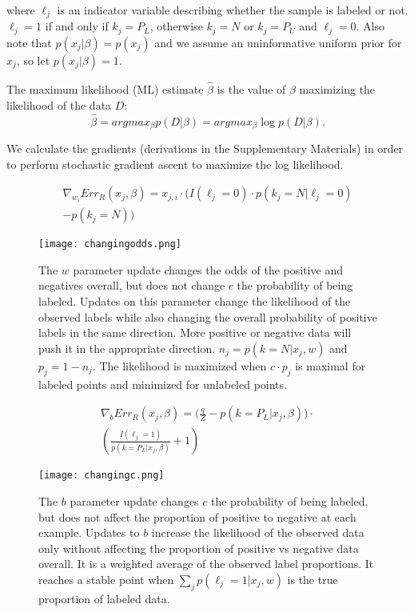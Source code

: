 \documentclass{article}
\begin{document}
where $\ell_j$ is an indicator variable describing whether the sample is labeled or not. $\ell_j = 1$ if and only if $k_j=P_L$, otherwise $k_j = N$ or $k_j=P_U$ and $\ell_j = 0$.  Also note that $p(x_j|\beta) = p(x_j)$ and we assume an uninformative uniform prior for $x_j$, so let $p(x_j|\beta) = 1$.

The maximum likelihood (ML) estimate $\hat \beta$ is the value of $\beta$ maximizing the likelihood of the data $D$:
$$
\hat \beta = arg max_{\beta} p(D | \beta) = arg max_{\beta} \log{p(D | \beta)}.
$$

We calculate the gradients (derivations in the Supplementary Materials) in order to perform stochastic gradient ascent to maximize the log likelihood.

\begin{eqnarray*}
\nabla_{w_i}{Err_R (x_j, \beta)} = x_{j,i} \cdot
    \big(	I(\ell_j=0) \cdot p(k_j=N | \ell_j=0) \\
		- p(k_j=N)
    \big)
\end{eqnarray*}

\begin{figure}[ht!]
\vskip 0.2in
\begin{center}
\centerline{\texttt{[image: changingodds.png]}}
\caption{The $w$ parameter update changes the odds of the positive and negatives overall, but does not change $c$ the probability of being labeled. Updates on this parameter change the likelihood of the observed labels while also changing the overall probability of positive labels in the same direction. More positive or negative data will push it in the appropriate direction. $n_j = p(k=N|x_j,w)$ and $p_j = 1-n_j$. The likelihood is maximized when $c \cdot p_{j}$ is maximal for labeled points and minimized for unlabeled points. }
\label{changingodds}
\end{center}
\vskip -0.2in
\end{figure}

\begin{eqnarray*}
\nabla_{b}{Err_R (x_j, \beta)}  = \Big( \frac{q}{Z} - p(k=P_L | x_j,\beta) \Big) \cdot \\
	\left( 
		\frac{I(\ell_j=1)}{p(k=P_L | x_j,\beta)} + 1 
	  \right)
\end{eqnarray*}

\begin{figure}[ht!]
\vskip 0.2in
\begin{center}
\centerline{\texttt{[image: changingc.png]}}
\caption{The $b$ parameter update changes $c$ the probability of being labeled, but does not affect the proportion of positive to negative at each example. Updates to $b$ increase the likelihood of the observed data only without affecting the proportion of positive vs negative data overall. It is a weighted average of the observed label proportions.  It reaches a stable point when $\sum_{j}{p(\ell_j=1|x_j,w)}$ is the true proportion of labeled data.}
\label{changingc}
\end{center}
\vskip -0.2in
\end{figure}
\end{document}
